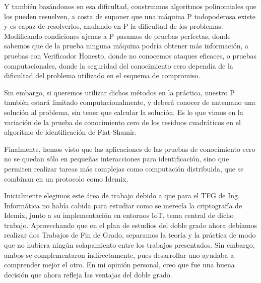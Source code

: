 Y también basándonos en esa dificultad, construimos algoritmos polinomiales que los pueden resuelven, a costa de suponer que una máquina P todopoderosa existe y es capaz de resolverlos, anulando en P la dificultad de los problemas. Modificando condiciones ajenas a P pasamos de pruebas perfectas, donde sabemos que de la prueba ninguna máquina podría obtener más información, a pruebas con Verificador Honesto, donde no conocemos ataques eficaces, o pruebas computacionales, donde la seguridad del conocimiento cero dependía de la dificultad del problema utilizado en el esquema de compromiso.

Sin embargo, si queremos utilizar dichos métodos en la práctica, nuestro P también estará limitado computacionalmente, y deberá conocer de antemano una solución al problema, sin tener que calcular la solución. Es lo que vimos en la variación de la prueba de conocimiento cero de los residuos cuadráticos en el algoritmo de identificación de Fiat-Shamir.

Finalmente, hemos visto que las aplicaciones de las pruebas de conocimiento cero no se quedan sólo en pequeñas interacciones para identificación, sino que permiten realizar tareas más complejas como computación distribuida, que se combinan en un protocolo como Idemix.

Inicialmente elegimos este área de trabajo debido a que para el TFG de Ing. Informática no había cabida para estudiar como se merecía la criptografía de Idemix, junto a su implementación en entornos IoT, tema central de dicho trabajo. Aprovechando que en el plan de estudios del doble grado ahora debíamos realizar dos Trabajos de Fin de Grado, separamos la teoría y la práctica de modo que no hubiera ningún solapamiento entre los trabajos presentados. Sin embargo, ambos se complementaron indirectamente, pues desarrollar uno ayudaba a comprender mejor el otro. En mi opinión personal, creo que fue una buena decisión que ahora refleja las ventajas del doble grado.



